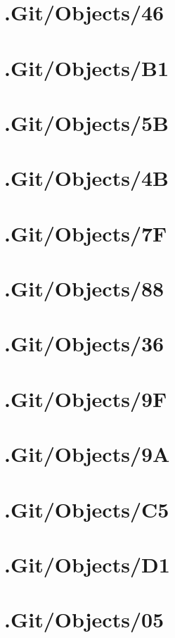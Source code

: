 \section*{.Git/Objects/46}

\section*{.Git/Objects/B1}

\section*{.Git/Objects/5B}

\section*{.Git/Objects/4B}

\section*{.Git/Objects/7F}

\section*{.Git/Objects/88}

\section*{.Git/Objects/36}

\section*{.Git/Objects/9F}

\section*{.Git/Objects/9A}

\section*{.Git/Objects/C5}

\section*{.Git/Objects/D1}

\section*{.Git/Objects/05}

